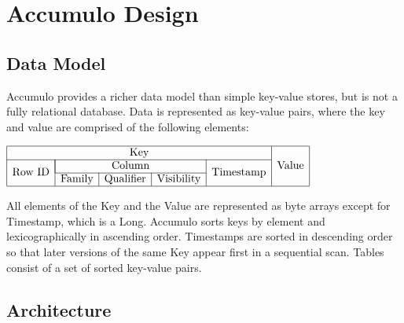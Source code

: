 
%
%

\chapter{Accumulo Design}

\section{Data Model}

Accumulo provides a richer data model than simple key-value stores, but is not a
fully relational database. Data is represented as key-value pairs, where the key and
value are comprised of the following elements:

\begin{center}
$\begin{array}{|c|c|c|c|c|c|} \hline
\multicolumn{5}{|c|}{\mbox{Key}} & \multirow{3}{*}{\mbox{Value}}\\ \cline{1-5}
\multirow{2}{*}{\mbox{Row ID}}& \multicolumn{3}{|c|}{\mbox{Column}} & \multirow{2}{*}{\mbox{Timestamp}} & \\ \cline{2-4}
& \mbox{Family} & \mbox{Qualifier} & \mbox{Visibility} & & \\ \hline
\end{array}$
\end{center}

All elements of the Key and the Value are represented as byte arrays except for
Timestamp, which is a Long. Accumulo sorts keys by element and lexicographically
in ascending order. Timestamps are sorted in descending order so that later
versions of the same Key appear first in a sequential scan. Tables consist of a set of
sorted key-value pairs.

\section{Architecture}

